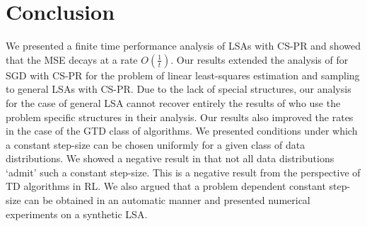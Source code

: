 \section{Conclusion}
We presented a finite time performance analysis of LSAs with CS-PR and showed that the MSE decays at a rate $O(\frac{1}{t})$. Our results extended the analysis of \citet{bach} for SGD with CS-PR for the problem of linear least-squares estimation and \iid sampling to general LSAs with CS-PR. Due to the lack of special structures, our analysis for the case of general LSA cannot recover entirely the results of \citet{bach} who use the problem specific structures in their analysis.
Our results also improved the rates in the case of the GTD class of algorithms. We presented conditions under which a constant step-size can be chosen uniformly for a given class of data distributions. We showed a negative result in that not all data distributions `admit' such a constant step-size. This is a negative result from the perspective of TD algorithms in RL. We also argued that a problem dependent constant step-size can be obtained in an automatic manner and presented numerical experiments on a synthetic LSA. %

